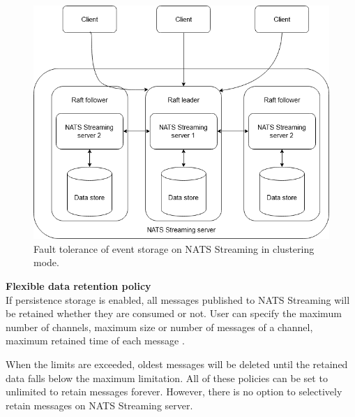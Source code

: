 \begin{figure}[h]
	\centering
	\includegraphics[width=12.2cm]{images/ft-eventstorage-nats.png}
	\caption{Fault tolerance of event storage on NATS Streaming in clustering mode.}
	\label{fig:natsftstorage}
\end{figure}

\textbf{Flexible data retention policy}\\
If persistence storage is enabled, all messages published to NATS Streaming will be retained whether they are consumed or not. User can specify the maximum number of channels, maximum size or number of messages of a channel, maximum retained time of each message \cite{natsconfiguring}.

When the limits are exceeded, oldest messages will be deleted until the retained data falls below the maximum limitation. All of these policies can be set to unlimited to retain messages forever. However, there is no option to selectively retain messages on NATS Streaming server.







